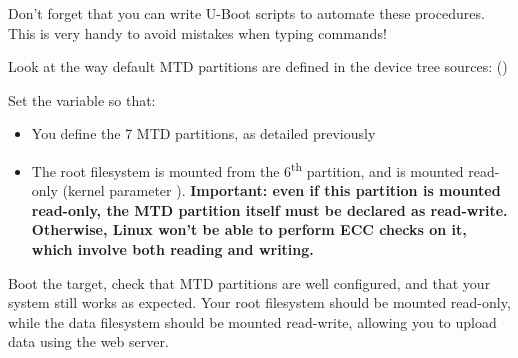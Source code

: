 Don't forget that you can write U-Boot scripts to automate these
procedures. This is very handy to avoid mistakes when typing commands!

Look at the way default MTD partitions are defined in the device tree
sources: ()

Set the  variable so that:

\begin{itemize}
\item You define the 7 MTD partitions, as detailed previously
\item The root filesystem is mounted from the 6\textsuperscript{th}
  partition, and is mounted read-only (kernel parameter ).
  {\bf Important: even if this partition is mounted read-only, the
  MTD partition itself must be declared as read-write. Otherwise,
  Linux won't be able to perform ECC checks on it, which involve
  both reading and writing.}
\end{itemize}

Boot the target, check that MTD partitions are well configured, and
that your system still works as expected. Your root filesystem should
be mounted read-only, while the data filesystem should be mounted
read-write, allowing you to upload data using the web server.
